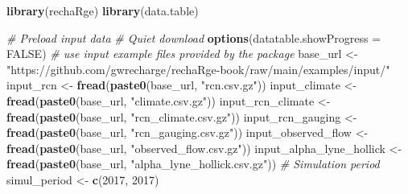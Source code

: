 \documentclass[
]{book}
\newenvironment{Shaded}{\begin{snugshade}}{\end{snugshade}}
\newcommand{\AttributeTok}[1]{\textcolor[rgb]{0.13,0.29,0.53}{#1}}
\newcommand{\CommentTok}[1]{\textcolor[rgb]{0.56,0.35,0.01}{\textit{#1}}}
\newcommand{\ConstantTok}[1]{\textcolor[rgb]{0.56,0.35,0.01}{#1}}
\newcommand{\DecValTok}[1]{\textcolor[rgb]{0.00,0.00,0.81}{#1}}
\newcommand{\FunctionTok}[1]{\textcolor[rgb]{0.13,0.29,0.53}{\textbf{#1}}}
\newcommand{\NormalTok}[1]{#1}
\newcommand{\OtherTok}[1]{\textcolor[rgb]{0.56,0.35,0.01}{#1}}
\newcommand{\StringTok}[1]{\textcolor[rgb]{0.31,0.60,0.02}{#1}}
\begin{document}
\begin{Shaded}
\begin{Highlighting}[]
\FunctionTok{library}\NormalTok{(rechaRge)}
\FunctionTok{library}\NormalTok{(data.table)}

\CommentTok{\# Preload input data}
\CommentTok{\# Quiet download}
\FunctionTok{options}\NormalTok{(}\AttributeTok{datatable.showProgress =} \ConstantTok{FALSE}\NormalTok{)}
\CommentTok{\# use input example files provided by the package}
\NormalTok{base\_url }\OtherTok{\textless{}{-}} \StringTok{"https://github.com/gwrecharge/rechaRge{-}book/raw/main/examples/input/"}
\NormalTok{input\_rcn }\OtherTok{\textless{}{-}} \FunctionTok{fread}\NormalTok{(}\FunctionTok{paste0}\NormalTok{(base\_url, }\StringTok{"rcn.csv.gz"}\NormalTok{))}
\NormalTok{input\_climate }\OtherTok{\textless{}{-}} \FunctionTok{fread}\NormalTok{(}\FunctionTok{paste0}\NormalTok{(base\_url, }\StringTok{"climate.csv.gz"}\NormalTok{))}
\NormalTok{input\_rcn\_climate }\OtherTok{\textless{}{-}} \FunctionTok{fread}\NormalTok{(}\FunctionTok{paste0}\NormalTok{(base\_url, }\StringTok{"rcn\_climate.csv.gz"}\NormalTok{))}
\NormalTok{input\_rcn\_gauging }\OtherTok{\textless{}{-}} \FunctionTok{fread}\NormalTok{(}\FunctionTok{paste0}\NormalTok{(base\_url, }\StringTok{"rcn\_gauging.csv.gz"}\NormalTok{))}
\NormalTok{input\_observed\_flow }\OtherTok{\textless{}{-}} \FunctionTok{fread}\NormalTok{(}\FunctionTok{paste0}\NormalTok{(base\_url, }\StringTok{"observed\_flow.csv.gz"}\NormalTok{))}
\NormalTok{input\_alpha\_lyne\_hollick }\OtherTok{\textless{}{-}} \FunctionTok{fread}\NormalTok{(}\FunctionTok{paste0}\NormalTok{(base\_url, }\StringTok{"alpha\_lyne\_hollick.csv.gz"}\NormalTok{))}
\CommentTok{\# Simulation period}
\NormalTok{simul\_period }\OtherTok{\textless{}{-}} \FunctionTok{c}\NormalTok{(}\DecValTok{2017}\NormalTok{, }\DecValTok{2017}\NormalTok{)}


\end{Highlighting}
\end{Shaded}
\end{document}
